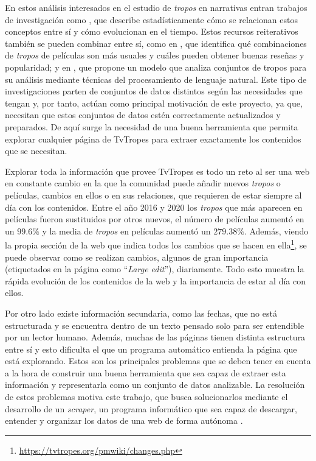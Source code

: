 En estos análisis interesados en el estudio de \textit{tropos} en narrativas
entran trabajos de investigación como \cite{garcia2020tropes}, que describe
estadísticamente cómo se relacionan estos conceptos entre sí y cómo evolucionan
en el tiempo. Estos recursos reiterativos también se pueden combinar entre sí,
como en \cite{garcia2021simpsons}, que identifica qué combinaciones de
\textit{tropos} de películas son más usuales y cuáles pueden obtener buenas
reseñas y popularidad; y en \cite{any2vec}, que propone un modelo que analiza
conjuntos de tropos para su análisis mediante técnicas del procesamiento de
lenguaje natural. Este tipo de investigaciones parten de conjuntos de datos
distintos según las necesidades que tengan y, por tanto, actúan como principal
motivación de este proyecto, ya que, necesitan que estos conjuntos de datos
estén correctamente actualizados y preparados. De aquí surge la necesidad de una
buena herramienta que permita explorar cualquier página de TvTropes para extraer
exactamente los contenidos que se necesitan.

Explorar toda la información que provee TvTropes es todo un reto al ser una web
en constante cambio en la que la comunidad puede añadir nuevos \textit{tropos} o
películas, cambios en ellos o en sus relaciones, que requieren de estar siempre
al día con los contenidos. Entre el año 2016 y 2020 los \textit{tropos} que más
aparecen en películas fueron sustituidos por otros nuevos, el número de
películas aumentó en un $99.6\%$ y la media de \textit{tropos} en películas
aumentó un $279.38\%$\cite{garcia2020tropes}. Además, viendo la propia sección
de la web que indica todos los cambios que se hacen en
ella\footnote{\url{https://tvtropes.org/pmwiki/changes.php}}, se puede observar
como se realizan cambios, algunos de gran importancia (etiquetados en la página
como ``\textit{Large edit}''), diariamente. Todo esto muestra la rápida
evolución de los contenidos de la web y la importancia de estar al día con
ellos. 

Por otro lado existe información secundaria, como las fechas, que no está
estructurada y se encuentra dentro de un texto pensado solo para ser entendible
por un lector humano. Además, muchas de las páginas tienen distinta estructura
entre sí y esto dificulta el que un programa automático entienda la página que
está explorando. Estos son los principales problemas que se deben tener en
cuenta a la hora de construir una buena herramienta que sea capaz de extraer
esta información y representarla como un conjunto de datos analizable. La
resolución de estos problemas motiva este trabajo, que busca solucionarlos
mediante el desarrollo de un \textit{scraper}, un programa informático que sea
capaz de descargar, entender y organizar los datos de una web de forma autónoma
\cite{apress2018scraping}.

